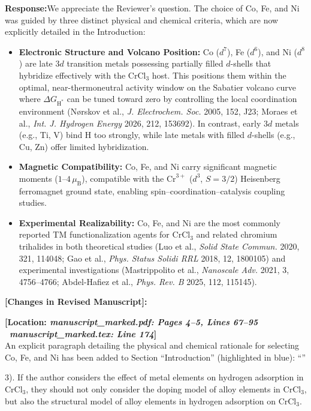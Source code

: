 \documentclass[11pt, sans, a4paper]{moderncv}
\newcommand{\response}{\vspace{0.4em}\noindent\textbf{\color{actionblue}Response:}\hspace{0.5em}}
\newcommand{\manuscriptchange}[1]{{\renewcommand{\label}[1]{}\vspace{0.4em}\noindent\textbf{\color{acsblue}[Changes in Revised Manuscript]:}\par\nopagebreak\vspace{0.15em}#1\vspace{0.4em}}}
\begin{document}
\response We appreciate the Reviewer's question. The choice of Co, Fe, and Ni was guided by three distinct physical and chemical criteria, which are now explicitly detailed in the Introduction:
\begin{itemize}[leftmargin=1.5em, itemsep=0.2em]
\item \textbf{Electronic Structure and Volcano Position:} Co ($d^7$), Fe ($d^6$), and Ni ($d^8$) are late $3d$ transition metals possessing partially filled $d$-shells that hybridize effectively with the $\text{CrCl}_3$ host. This positions them within the optimal, near-thermoneutral activity window on the Sabatier volcano curve where $\Delta G_{\mathrm{H}^*}$ can be tuned toward zero by controlling the local coordination environment (N{\o}rskov et al., \textit{J. Electrochem. Soc.} 2005, 152, J23; Moraes et al., \textit{Int. J. Hydrogen Energy} 2026, 212, 153692). In contrast, early $3d$ metals (e.g., Ti, V) bind H too strongly, while late metals with filled $d$-shells (e.g., Cu, Zn) offer limited hybridization.
\item \textbf{Magnetic Compatibility:} Co, Fe, and Ni carry significant magnetic moments ($1\text{--}4\,\mu_{\mathrm{B}}$), compatible with the $\text{Cr}^{3+}$ ($d^3$, $S=3/2$) Heisenberg ferromagnet ground state, enabling spin--coordination--catalysis coupling studies.
\item \textbf{Experimental Realizability:} Co, Fe, and Ni are the most commonly reported TM functionalization agents for $\text{CrCl}_3$ and related chromium trihalides in both theoretical studies (Luo et al., \textit{Solid State Commun.} 2020, 321, 114048; Gao et al., \textit{Phys. Status Solidi RRL} 2018, 12, 1800105) and experimental investigations (Mastrippolito et al., \textit{Nanoscale Adv.} 2021, 3, 4756--4766; Abdel-Hafiez et al., \textit{Phys. Rev. B} 2025, 112, 115145).
\end{itemize}

\manuscriptchange{\textbf{[Location: \textit{manuscript\_marked.pdf: Pages 4--5, Lines 67--95} \textbar\ \textit{manuscript\_marked.tex: Line 174}]}\\ An explicit paragraph detailing the physical and chemical rationale for selecting Co, Fe, and Ni has been added to Section ``Introduction'' (highlighted in blue): ``{\itshape \ExecuteMetaData[manuscript_marked.tex]{R1C2Rationale}}''}

\vspace{0.8em}

\begin{reviewercomment}
3). If the author considers the effect of metal elements on hydrogen adsorption in $\text{CrCl}_3$, they should not only consider the doping model of alloy elements in $\text{CrCl}_3$, but also the structural model of alloy elements in hydrogen adsorption on $\text{CrCl}_3$.
\end{reviewercomment}
\end{document}
